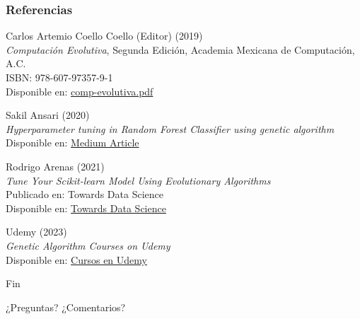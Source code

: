 \documentclass[
	11pt, %
]{beamer}
\begin{document}
\begin{frame}
    \frametitle{Referencias}
    
    \begin{thebibliography}{99}
        \footnotesize
        
            Carlos Artemio Coello Coello (Editor) (2019) \\
            \emph{Computaci\'on Evolutiva}, Segunda Edici\'on, Academia Mexicana de Computaci\'on, A.C. \\
            ISBN: 978-607-97357-9-1 \\
            Disponible en: \href{https://amexcomp.mx/media/publicaciones/comp-evolutiva.pdf}{comp-evolutiva.pdf}

            Sakil Ansari (2020) \\
            \emph{Hyperparameter tuning in Random Forest Classifier using genetic algorithm} \\
            Disponible en: \href{https://sakilansari4.medium.com/hyperparameter-tuning-in-random-forest-classifier-using-genetic-algorithm-ae582ae6655c}{Medium Article}

            Rodrigo Arenas (2021) \\
            \emph{Tune Your Scikit-learn Model Using Evolutionary Algorithms} \\
            Publicado en: Towards Data Science \\
            Disponible en: \href{https://towardsdatascience.com/tune-your-scikit-learn-model-using-evolutionary-algorithms-30538248ac16}{Towards Data Science}

            Udemy (2023) \\
            \emph{Genetic Algorithm Courses on Udemy} \\
            Disponible en: \href{https://www.udemy.com/courses/search/?src=ukw&q=Genetic+Algorithm}{Cursos en Udemy}
    \end{thebibliography}
\end{frame}





\begin{frame}[plain]
	\begin{center}
		{\Huge Fin}
		
		\bigskip\bigskip
		
		{\LARGE ¿Preguntas? ¿Comentarios?}
	\end{center}
\end{frame}

\end{document}
